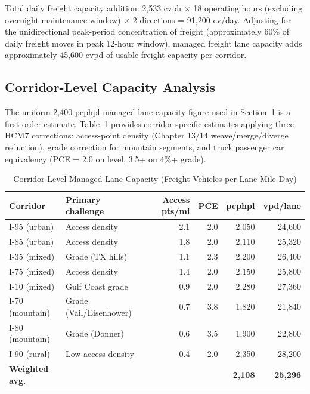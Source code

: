 Total daily freight capacity addition: 2,533 cvph $\times$ 18 operating hours (excluding overnight maintenance window) $\times$ 2 directions = 91,200 cv/day. Adjusting for the unidirectional peak-period concentration of freight (approximately 60\% of daily freight moves in peak 12-hour window), managed freight lane capacity adds approximately 45,600 cvpd of usable freight capacity per corridor.

\subsection{Corridor-Level Capacity Analysis}
\label{sec:corridor-capacity}

The uniform 2,400 pcphpl managed lane capacity figure used in Section~1 is a
first-order estimate. Table~\ref{tab:corridor-capacity} provides corridor-specific
estimates applying three HCM7 corrections: access-point density (Chapter 13/14
weave/merge/diverge reduction), grade correction for mountain segments, and
truck passenger car equivalency (PCE = 2.0 on level, 3.5+ on 4\%+ grade).

\begin{table}[h!]
\centering
\caption{Corridor-Level Managed Lane Capacity (Freight Vehicles per Lane-Mile-Day)}
\label{tab:corridor-capacity}
\begin{tabular}{llrrrr}
\toprule
\textbf{Corridor} & \textbf{Primary challenge} & \textbf{Access pts/mi} & \textbf{PCE} & \textbf{pcphpl} & \textbf{vpd/lane} \\
\midrule
I-95 (urban)    & Access density     & 2.1 & 2.0 & 2,050 & 24,600 \\
I-85 (urban)    & Access density     & 1.8 & 2.0 & 2,110 & 25,320 \\
I-35 (mixed)    & Grade (TX hills)   & 1.1 & 2.3 & 2,200 & 26,400 \\
I-75 (mixed)    & Access density     & 1.4 & 2.0 & 2,150 & 25,800 \\
I-10 (mixed)    & Gulf Coast grade   & 0.9 & 2.0 & 2,280 & 27,360 \\
I-70 (mountain) & Grade (Vail/Eisenhower) & 0.7 & 3.8 & 1,820 & 21,840 \\
I-80 (mountain) & Grade (Donner)     & 0.6 & 3.5 & 1,900 & 22,800 \\
I-90 (rural)    & Low access density & 0.4 & 2.0 & 2,350 & 28,200 \\
\midrule
\textbf{Weighted avg.} & & & & \textbf{2,108} & \textbf{25,296} \\
\bottomrule
\end{tabular}
\end{table}

